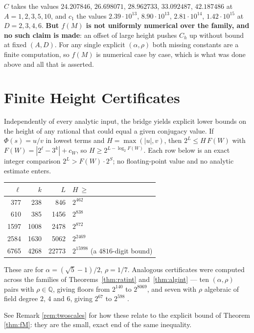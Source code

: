 \documentclass[11pt]{article}
\newcommand{\Q}{\mathbb{Q}}
\newcommand{\cw}{c_W}
\begin{document}
$C$ takes the values $24.207846$, $26.698071$, $28.962733$, $33.092487$, $42.187486$ at $A=1,2,3,5,10$,
and $c_1$ the values $2.39\cdot10^{13}$, $8.90\cdot10^{13}$, $2.81\cdot10^{14}$, $1.42\cdot10^{15}$ at
$D=2,3,4,6$. \textbf{But $f(M)$ is not uniformly numerical over the family, and no such claim is made}:
an offset of large height pushes $C_h$ up without bound at fixed $(A,D)$. For any single explicit
$(\alpha,\rho)$ both missing constants are a finite computation, so $f(M)$ is numerical case by case,
which is what was done above and all that is asserted.

\section{Finite Height Certificates}
\label{sec:certificates}

Independently of every analytic input, the bridge yields explicit lower bounds on the height of any
rational that could equal a given conjugacy value. If $\Phi(s)=u/v$ in lowest terms and
$H=\max(|u|,v)$, then $2^{L}\le H\,F(W)$ with $F(W)=|2^\ell-3^k|+\cw$, so
$H\ge2^{L-\log_2F(W)}$. Each row below is an exact integer comparison $2^L>F(W)\cdot2^S$; no
floating-point value and no analytic estimate enters.

\begin{center}
\begin{tabular}{@{}rrrl@{}}
\toprule
$\ell$ & $k$ & $L$ & $H\ \ge$ \\
\midrule
377 & 238 & 846 & $2^{462}$ \\
610 & 385 & 1456 & $2^{838}$ \\
1597 & 1008 & 2478 & $2^{872}$ \\
2584 & 1630 & 5062 & $2^{2469}$ \\
6765 & 4268 & 22773 & $2^{15998}$ \quad(a $4816$-digit bound) \\
\bottomrule
\end{tabular}
\end{center}

These are for $\alpha=(\sqrt5-1)/2$, $\rho=1/7$. Analogous certificates were computed across the
families of Theorems~\ref{thm:ratint} and~\ref{thm:algint} --- ten $(\alpha,\rho)$ pairs with
$\rho\in\Q$, giving floors from $2^{140}$ to $2^{8069}$, and seven with $\rho$ algebraic of field
degree $2$, $4$ and $6$, giving $2^{67}$ to $2^{598}$ \cite{Phase12Quad,Phase13Alg}.

See Remark \ref{rem:twoscales} for how these relate to the explicit bound of
Theorem \ref{thm:fM}: they are the small, exact end of the same inequality.
\end{document}
